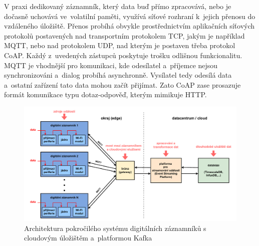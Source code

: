V praxi dedikovaný záznamník, který data buď přímo zpracovává, nebo je dočasně uchovává ve~volatilní paměti, využívá síťové rozhraní k~jejich přenosu do vzdáleného úložiště. Přenos probíhá obvykle prostřednictvím aplikačních síťových protokolů postavených nad transportním protokolem TCP, jakým je například MQTT, nebo nad protokolem UDP, nad kterým je postaven třeba protokol CoAP. Každý z~uvedených zástupců poskytuje trošku odlišnou funkcionalitu. MQTT je vhodnější pro komunikaci, kde odesílatel a~příjemce nejsou synchronizováni a~dialog probíhá asynchronně. Vysílatel tedy odesílá data a~ostatní zařízení tato data mohou začít přijímat. Zato CoAP zase prosazuje formát komunikace typu dotaz-odpověď, kterým mimikuje HTTP.~\cite{emq_mqtt_vs_coap, smart_datalogger_data_acquisition_cpu, iot_datalogger_with_timestamping}


\begin{figure}[h]
    \centering
    \includegraphics[width=1.00\textwidth]{obrazky-figures/advanced_architecture_of_datalogging.pdf}
    
    \caption{Architektura pokročilého systému digitálních záznamníků s cloudovým úložištěm a~platformou Kafka~\cite{influxdata_advanced_datalogging_mmqt, confluent_advanced_datalogging}}
    \label{fig:advanced-architecture-of-datalogging}
\end{figure}



